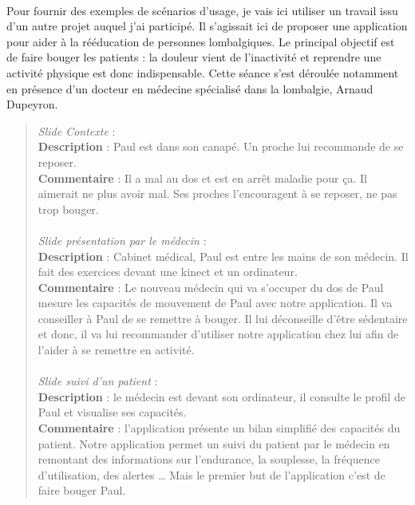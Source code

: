\paragraph{}Pour fournir des exemples de scénarios d'usage, je vais ici utiliser un travail issu d'un autre projet auquel j'ai participé. Il s'agissait ici de proposer une application pour aider à la rééducation de personnes lombalgiques. Le principal objectif est de faire bouger les patients : la douleur vient de l'inactivité et reprendre une activité physique est donc indispensable. Cette séance s'est déroulée notamment en présence d'un docteur en médecine spécialisé dans la lombalgie, Arnaud Dupeyron.

\begin{quotation}
	\emph{Slide Contexte} :\\
	\textbf{Description} : Paul est dans son canapé. Un proche lui recommande de se reposer.\\
	\textbf{Commentaire} : Il a mal au dos et est en arrêt maladie pour ça. Il aimerait ne plus avoir mal. Ses proches l’encouragent à se reposer, ne pas trop bouger.
	\paragraph{}
	\emph{Slide présentation par le médecin} :\\
	\textbf{Description} : Cabinet médical, Paul est entre les mains de son médecin. Il fait des exercices devant une kinect et un ordinateur.\\
	\textbf{Commentaire} : Le nouveau médecin qui va s’occuper du dos de Paul mesure les capacités de mouvement de Paul avec notre application. Il va conseiller à Paul de se remettre à bouger. Il lui déconseille d’être sédentaire et donc, il va lui recommander d’utiliser notre application chez lui afin de l’aider à se remettre en activité.
	\paragraph{}
	\emph{Slide suivi d’un patient} :\\
	\textbf{Description} : le médecin est devant son ordinateur, il consulte le profil de Paul et visualise ses capacités.\\
	\textbf{Commentaire} : l’application présente un bilan simplifié des capacités du patient. Notre application permet un suivi du patient par le médecin en remontant des informations sur l’endurance, la souplesse, la fréquence d’utilisation, des alertes … Mais le premier but de l’application c’est de faire bouger Paul.
\end{quotation}

